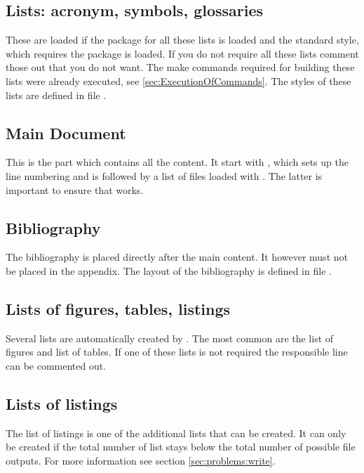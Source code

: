 \subsection{Lists: acronym, symbols, glossaries}
These are loaded if the package for all these lists is loaded and the standard 
style, which requires the  package is loaded. If you do 
not require all these lists comment those out that you do not want. The make 
commands required for building these lists were already executed, see 
\vref{sec:ExecutionOfCommands}. The styles of these lists are defined in file 
.

\subsection{Main Document}
This is the part which contains all the content. It start with , which sets up the line numbering and is followed by a list of files loaded with . The latter is important to ensure that  works.

\subsection{Bibliography}
The bibliography is placed directly after the main content. It however must 
not be placed in the appendix. The layout of the bibliography is defined in 
file .
%

\subsection{Lists of figures, tables, listings}
Several lists are automatically created by \latex. The most common are the list of figures and list of tables. If one of these lists is not required the responsible line can be commented out. 
%

\subsection{Lists of listings}
The list of listings is one of the additional lists that can be created. 
It can only be created if the total number of list stays below the total number of possible file outputs. For more information see section \ref{sec:problems:write}.

